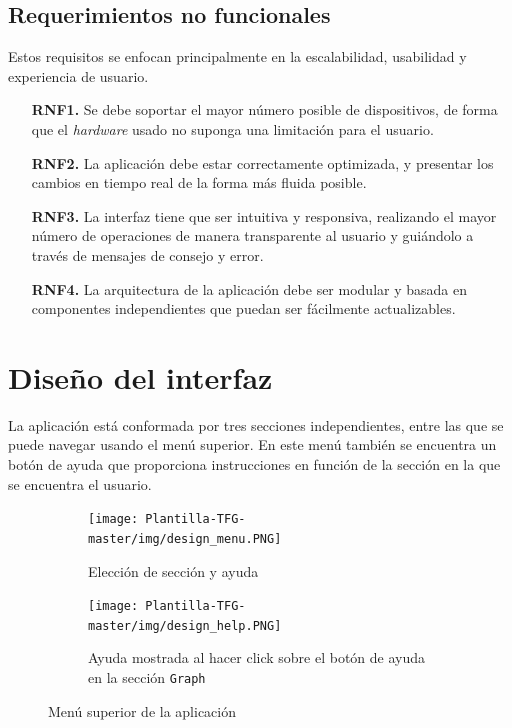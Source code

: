 \subsection{Requerimientos no funcionales}
Estos requisitos se enfocan principalmente en la escalabilidad, usabilidad y experiencia de usuario.
\begin{enumerate}
    \item [\textbf{RNF1.}] Se debe soportar el mayor número posible de dispositivos, de forma que el \textit{hardware} usado no suponga una limitación para el usuario.
    \item [\textbf{RNF2.}] La aplicación debe estar correctamente optimizada, y presentar los cambios en tiempo real de la forma más fluida posible.
    \item [\textbf{RNF3.}] La interfaz tiene que ser intuitiva y responsiva, realizando el mayor número de operaciones de manera transparente al usuario y guiándolo a través de mensajes de consejo y error.
    \item [\textbf{RNF4.}] La arquitectura de la aplicación debe ser modular y basada en componentes independientes que puedan ser fácilmente actualizables.
\end{enumerate}


\section{Diseño del interfaz}
La aplicación está conformada por tres secciones independientes, entre las que se puede navegar usando el menú superior. En este menú también se encuentra un botón de ayuda que proporciona instrucciones en función de la sección en la que se encuentra el usuario.\newline
\begin{figure}[ht!]
    \centering
    \begin{subfigure}[b]{\textwidth}
        \centering
        \texttt{[image: Plantilla-TFG-master/img/design\_menu.PNG]}
        \caption{Elección de sección y ayuda}
    \end{subfigure}
    \hfill
    \begin{subfigure}[b]{\textwidth}
        \centering
        \texttt{[image: Plantilla-TFG-master/img/design\_help.PNG]}
        \caption{Ayuda mostrada al hacer click sobre el botón de ayuda en la sección \texttt{Graph}}
    \end{subfigure}
    \caption{Menú superior de la aplicación}
\end{figure}

